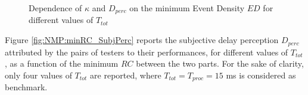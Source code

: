 \begin{figure}[!tb]
\begin{flushright}
    \hfil
\end{flushright}
\caption{Dependence of $\kappa$ and $D_{perc}$ on the minimum Event Density $ED$ for different values of $T_{tot}$}
\label{fig:NMP:minED}
\end{figure}

Figure \ref{fig:NMP:minRC_SubjPerc} reports the subjective delay perception $D_{perc}$ attributed by the pairs of testers to their performances, for different values of $T_{tot}$, as a function of the minimum $RC$ between the two parts. For the sake of clarity, only four values of $T_{tot}$ are reported, where $T_{tot}=T_{proc}=15$ ms is considered as benchmark. 

